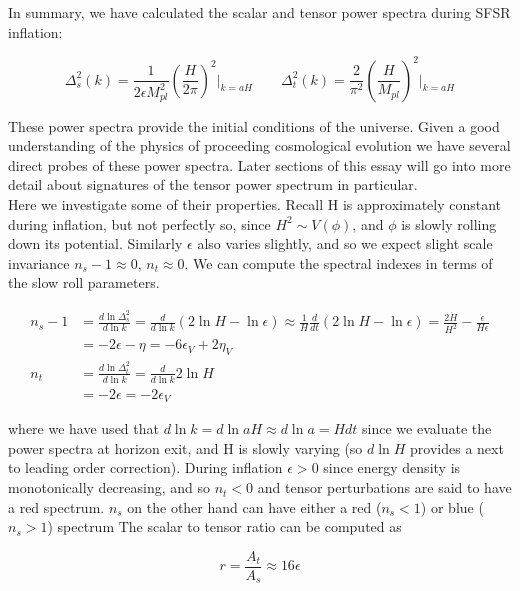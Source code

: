 \documentclass[a4paper,10pt]{article}
\newcommand{\Mp}{M_{pl}}
\begin{document}
In summary, we have calculated the scalar and tensor power spectra during SFSR inflation:

\begin{equation}
\Delta^2_{s}(k) = \frac{1}{2\epsilon\Mp^2}\left(\frac{H}{2\pi}\right)^2\rvert_{k=aH} \qquad
\Delta^2_t(k)= \frac{2}{\pi^2}\left(\frac{H}{\Mp}\right)^2\rvert_{k=aH}
\end{equation}

These power spectra provide the initial conditions of the universe. Given a good understanding of the physics of proceeding cosmological evolution we have several direct probes of these power spectra. Later sections of this essay will go into more detail about signatures of the tensor power spectrum in particular.\\

Here we investigate some of their properties. Recall H is approximately constant during inflation, but not perfectly so, since $H^2 \sim V(\phi)$, and $\phi$ is slowly rolling down its potential. Similarly $\epsilon$ also varies slightly, and so we expect slight scale invariance $n_s-1\approx0$, $n_t\approx0$. We can compute the spectral indexes in terms of the slow roll parameters. 

\begin{equation}\begin{split}
n_s-1 &= \frac{d\ln{\Delta^2_s}}{d\ln{k}} = \frac{d}{d\ln{k}}(2\ln{H}-\ln{\epsilon}) \approx \frac{1}{H}\frac{d}{dt}(2\ln{H}-\ln{\epsilon}) = \frac{2\dot{H}}{H^2}-\frac{\dot{\epsilon}}{H\epsilon}\\
& = -2\epsilon-\eta = -6\epsilon_V+2\eta_V\\
n_t &= \frac{d\ln{\Delta^2_t}}{d\ln{k}} = \frac{d}{d\ln{k}}2\ln{H}\\
&=-2\epsilon=-2\epsilon_V
\end{split}\end{equation}

where we have used that $d\ln{k} = d\ln{aH} \approx d\ln{a} = Hdt$ since we evaluate the power spectra at horizon exit, and H is slowly varying (so $d\ln{H}$ provides a next to leading order correction). During inflation $\epsilon>0$ since energy density is monotonically decreasing, and so $n_t<0$ and tensor perturbations are said to have a red spectrum. $n_s$ on the other hand can have either a red ($n_s<1$) or blue ($n_s>1$) spectrum The scalar to tensor ratio can be computed as

\begin{equation}
r=\frac{A_t}{A_s} \approx 16\epsilon
\end{equation}
\end{document}
